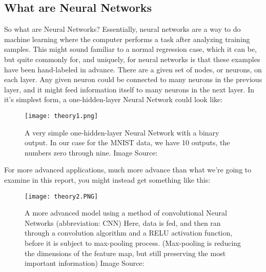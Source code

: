 \documentclass{article}
\begin{document}
\subsection{What are Neural Networks}
So what are Neural Networks? Essentially, neural networks are a way to do machine learning where the computer performs a task after analyzing training samples. This might sound familiar to a normal regression case, which it can be, but quite commonly for, and uniquely, for neural networks is that these examples have been hand-labeled in advance. There are a given set of nodes, or neurons, on each layer. Any given neuron could be connected to many neurons in the previous layer, and it might feed information itself to many neurons in the next layer.
\newline
In it's simplest form, a one-hidden-layer Neural Network could look like:
\begin{figure}[ht!]
    \centering
    \texttt{[image: theory1.png]}
    \caption{A very simple one-hidden-layer Neural Network with a binary output. \newline
    In our case for the MNIST data, we have 10 outputs, the numbers zero through nine.\newline
    Image Source: \cite{neuralimg1}}
    \label{fig11}
\end{figure}
\newline
For more advanced applications, much more advance than what we're going to examine in this report, you might instead get something like this:
\begin{figure}[ht!]
    \centering
    \texttt{[image: theory2.PNG]}
    \caption{A more advanced model using a method of convolutional Neural Networks (abbreviation: CNN) \newline
    Here, data is fed, and then ran through a convolution algorithm and a RELU activation function, before it is subject to max-pooling process. (Max-pooling is reducing the dimensions of the feature map, but still preserving the most important information) \newline
    Image Source: \cite{neuralimg2}}
    \label{fig12}
\end{figure} \newpage
\end{document}
